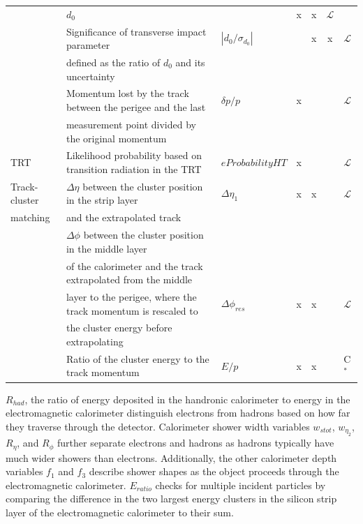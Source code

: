 \begin{table}
\begin{adjustwidth}{-1in}{-1in}
\begin{center}
\begin{tabular}{|l|l|l|c|c|c|l|}
                     &       $d_0$  & & x & x & $\mathcal{L}$ \\
\cline{2-7}
                     & Significance of transverse impact parameter & $|{d_0/\sigma_{d_0}}|$  & & x & x & $\mathcal{L}$  \\
                   & defined as the ratio of $d_0$ and its uncertainty                     &  & & & &              \\
\cline{2-7}
                     &  Momentum lost by the track between the perigee and the last &  $\delta p/p$ & x & & & $\mathcal{L}$ \\
                   & measurement point divided by the original momentum & & & & & \\
\hline
TRT                       & Likelihood probability based on transition radiation in the TRT &   $eProbabilityHT$ & x & & & $\mathcal{L}$  \\
	\hline
Track-cluster     & $\Delta\eta$ between the cluster position in the strip layer &   $\Delta \eta_1$ & x & x & & $\mathcal{L}$  \\
matching          &  and the extrapolated track & & & & &   \\
\cline{2-7}
&   $\Delta\phi$ between the cluster position in the middle layer &   & & & &  \\
&   of the calorimeter and the track extrapolated from the middle & & & & & \\
& layer to the perigee, where the track momentum is rescaled  to & $\Delta \phi_{res}$ & x & x & & $\mathcal{L}$  \\
&   the cluster energy before extrapolating  & & & & &  \\
\cline{2-7}
                    & Ratio of the cluster energy to the track momentum            &       $E/p$   & x & x & & C$^{*}$\\ 
\hline
\end{tabular}
\end{center}
\end{adjustwidth}
\end{table}

$R_{had}$, the ratio of energy deposited in the handronic calorimeter to energy in the electromagnetic calorimeter distinguish electrons from hadrons based on how far they traverse through the detector. Calorimeter shower width variables $w_{stot}$, $w_{\eta}_2$, $R_{\eta}$, and $R_{\phi}$ further separate electrons and hadrons as hadrons typically have much wider showers than electrons. Additionally, the other calorimeter depth variables $f_1$ and $f_3$ describe shower shapes as the object proceeds through the electromagnetic calorimeter.  $E_{ratio}$ checks for multiple incident particles by comparing the difference in the two largest energy clusters in the silicon strip layer of the electromagnetic calorimeter to their sum. \\

